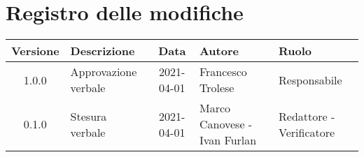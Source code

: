 \section*{Registro delle modifiche}

\begin{center}
	\begin{longtable}{|c|p{4cm}|c|p{3cm}|p{3cm}|}
		\hline
		\rowcolor{lighter-grayer}
		\textbf{Versione} & \textbf{Descrizione}             & \textbf{Data} & \textbf{Autore} & \textbf{Ruolo} \\
		\hline
		\endfirsthead


		\hline
		1.0.0 & Approvazione verbale & 2021-04-01 & Francesco Trolese & Responsabile \\
		0.1.0 & Stesura verbale & 2021-04-01 & Marco Canovese - Ivan Furlan & Redattore - Verificatore \\
		\hline
	\end{longtable}
\end{center}